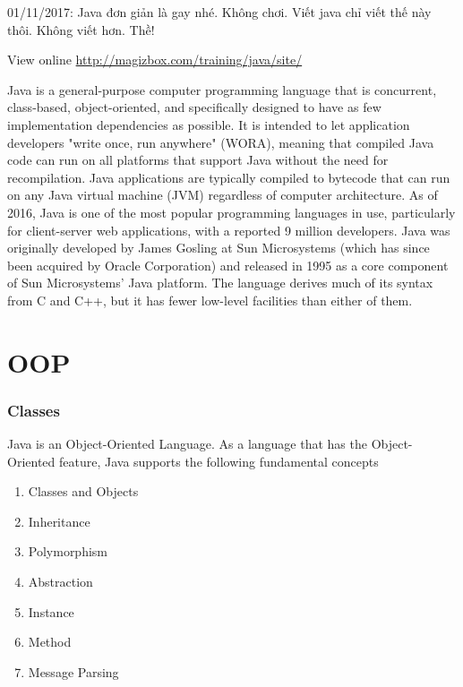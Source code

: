 01/11/2017: Java đơn giản là gay nhé. Không chơi. Viết java chỉ viết thế này thôi. Không viết hơn. Thề!

View online \href{http://magizbox.com/training/java/site/}{http://magizbox.com/training/java/site/}

Java is a general-purpose computer programming language that is concurrent, class-based, object-oriented, and specifically designed to have as few implementation dependencies as possible. It is intended to let application developers "write once, run anywhere" (WORA), meaning that compiled Java code can run on all platforms that support Java without the need for recompilation. Java applications are typically compiled to bytecode that can run on any Java virtual machine (JVM) regardless of computer architecture. As of 2016, Java is one of the most popular programming languages in use, particularly for client-server web applications, with a reported 9 million developers. Java was originally developed by James Gosling at Sun Microsystems (which has since been acquired by Oracle Corporation) and released in 1995 as a core component of Sun Microsystems' Java platform. The language derives much of its syntax from C and C++, but it has fewer low-level facilities than either of them.






\chapter{OOP}

\subsection{Classes}

Java is an Object-Oriented Language. As a language that has the Object-Oriented feature, Java supports the following fundamental concepts

\begin{enumerate}
  \item Classes and Objects
  \item Inheritance
  \item Polymorphism
  \item Abstraction
  \item Instance
  \item Method
  \item Message Parsing
\end{enumerate}



